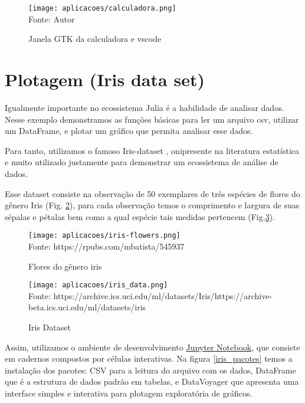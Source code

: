 \begin{figure}[H]
   \begin{center}
       \caption{Janela GTK da calculadora e vscode} \label{calculadora}
       \texttt{[image: aplicacoes/calculadora.png]} \\
       {\tiny \sf Fonte: Autor}
   \end{center}
  \end{figure}






\section{Plotagem (Iris data set)}
Igualmente importante no ecossistema Julia é a habilidade de analisar dados. Nesse exemplo demonstramos as funções básicas para ler um arquivo csv, utilizar um DataFrame, e plotar um gráfico que permita analisar esse dados. 

Para tanto, utilizamos o famoso Iris-dataset \cite{Fisher1936}, onipresente na literatura estatística e muito utilizado justamente para demonstrar um ecossistema de análise de dados. 

Esse dataset consiste na observação de 50 exemplares de três espécies de flores do gênero Iris (Fig. \ref{iris_flowers}), para cada observação temos o comprimento e largura de suas sépalas e pétalas bem como a qual espécie tais medidas pertencem (Fig.\ref{iris_data}).

\begin{figure}[H]
   \begin{center}
       \caption{Flores do gênero iris} \label{iris_flowers}
       \texttt{[image: aplicacoes/iris-flowers.png]} \\
       {\tiny \sf Fonte: https://rpubs.com/mbatista/545937}
   \end{center}
\end{figure}

\begin{figure}[H]
   \begin{center}
       \caption{Iris Dataset} \label{iris_data}
       \texttt{[image: aplicacoes/iris\_data.png]} \\
       {\tiny \sf Fonte: https://archive.ics.uci.edu/ml/datasets/Iris/https://archive-beta.ics.uci.edu/ml/datasets/iris}
   \end{center}
\end{figure}

Assim, utilizamos o ambiente de desenvolvimento \href{https://jupyter.org/}{Jupyter Notebook}, que consiste em cadernos compostos por células interativas. 
Na figura \ref{iris_pacotes} temos a instalação dos pacotes: CSV para a leitura do arquivo com os dados, DataFrame que é a estrutura de dados padrão em tabelas, e DataVoyager que apresenta uma interface simples e interativa para plotagem exploratória de gráficos.

